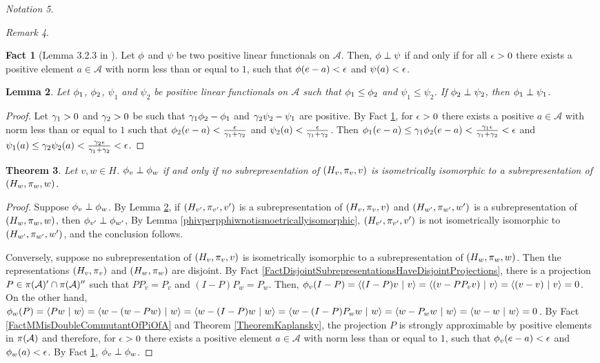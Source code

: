 \documentclass{amsart}
\def\bfc{\begin{fact}}\def\efc{\end{fact}}
\def\blm{\begin{lemma}}\def\elm{\end{lemma}}
\def\bpf{\begin{proof}}\def\epf{\end{proof}}
\def\A{\mathcal{A}}
\newtheorem{theo}{Theorem}[section]
\newtheorem{lemma}[theo]{Lemma}
\theoremstyle{definition}
\newtheorem{fact}[theo]{Fact}
\theoremstyle{remark}
\newtheorem{rem}[theo]{Remark}
\newtheorem{nota}[theo]{Notation}
\begin{document}
\begin{nota}
\begin{rem}
\bfc[Lemma 3.2.3 in \cite{Pe}]\label{phiperppsi}
Let $\phi$ and $\psi$ be two positive linear functionals on $\A$. Then, $\phi\perp\psi$ if and only if for all $\epsilon>0$ there exists a positive element $a\in\A$ with norm less than or equal to $1$, such that $\phi(e-a)<\epsilon$ and $\psi(a)<\epsilon$.
\efc

\blm\label{phi1lessthanphi2perppsi1lessthatpsi2}
Let $\phi_1$, $\phi_2$, $\psi_1$ and $\psi_2$ be positive linear functionals on $\A$ such that $\phi_1\leq\phi_2$ and $\psi_1\leq\psi_2$. If $\phi_2\perp\psi_2$, then $\phi_1\perp\psi_1$.
\elm
\bpf
Let $\gamma_1>0$ and $\gamma_2>0$ be such that $\gamma_1\phi_2-\phi_1$ and $\gamma_2\psi_2-\psi_1$ are positive. By Fact \ref{phiperppsi}, for $\epsilon>0$ there exists a positive $a\in\A$ with norm less than or equal to $1$ such that $\phi_2(e-a)<\frac{\epsilon}{\gamma_1+\gamma_2}$ and $\psi_2(a)<\frac{\epsilon}{\gamma_1+\gamma_2}$.
Then $\phi_1(e-a)\leq\gamma_1\phi_2(e-a)<\frac{\gamma_1\epsilon}{\gamma_1+\gamma_2}<\epsilon$ and $\psi_1(a)\leq\gamma_2\psi_2(a)<\frac{\gamma_2\epsilon}{\gamma_1+\gamma_2}<\epsilon$. 
\epf

\begin{theo}\label{HvperpHw}
Let $v,w\in H$. $\phi_v\perp\phi_w$ if and only if no subrepresentation of $(H_v,\pi_v,v)$ is isometrically isomorphic to a subrepresentation of $(H_w,\pi_w,w)$.
\end{theo}
\bpf
Suppose $\phi_v\perp\phi_w$. By Lemma \ref{phi1lessthanphi2perppsi1lessthatpsi2}, if $(H_{v^\prime},\pi_{v^\prime},v^\prime)$ is a subrepresentation of $(H_v,\pi_v,v)$ and $(H_{w^\prime},\pi_{w^\prime},w^\prime)$  is a subrepresentation of $(H_w,\pi_w,w)$, then $\phi_{v^\prime}\perp\phi_{w^\prime}$, By Lemma \ref{phivperpphiwnotismoetricallyisomorphic}, $(H_{v^\prime},\pi_{v^\prime},v^\prime)$ is not isometrically isomorphic to $(H_{w^\prime},\pi_{w^\prime},w^\prime)$, and the conclusion follows.

Conversely, suppose no subrepresentation of $(H_v,\pi_v,v)$ is isometrically isomorphic to a subrepresentation of $(H_w,\pi_w,w)$. Then the representations $(H_v,\pi_v)$ and $(H_w,\pi_w)$ are disjoint. By Fact \ref{FactDisjointSubrepresentationsHaveDisjointProjections}, there is a projection $P\in\p(\A)^\prime\cap\p(\A)^{\prime\prime}$ such that $PP_v=P_v$ and $(I-P)P_w=P_w$. Then, $\f_v(I-P)=\langle (I-P)v\ |\ v\rangle=\langle (v-PP_vv)\ |\ v\rangle=\langle (v-v)\ |\ v\rangle=0$. On the other hand, $\f_w(P)=\langle Pw\ |\ w\rangle=\langle w-(w-Pw)\ |\ w\rangle=\langle w-(I-P)w\ |\ w\rangle=\langle w-(I-P)P_ww\ |\ w\rangle=\langle w-P_ww\ |\ w\rangle=\langle w-w\ |\ w\rangle=0$. By Fact \ref{FactMMisDoubleCommutantOfPiOfA} and Theorem \ref{TheoremKaplansky}, the projection $P$ is strongly approximable by positive elements in $\p(\A)$ and therefore, for $\epsilon>0$ there exists a positive element $a\in\A$ with norm less than or equal to $1$, such that $\phi_v(e-a)<\epsilon$ and $\phi_w(a)<\epsilon$. By Fact \ref{phiperppsi}, $\phi_v\perp\phi_w$.
\epf


\end{rem}
\end{nota}
\end{document}
